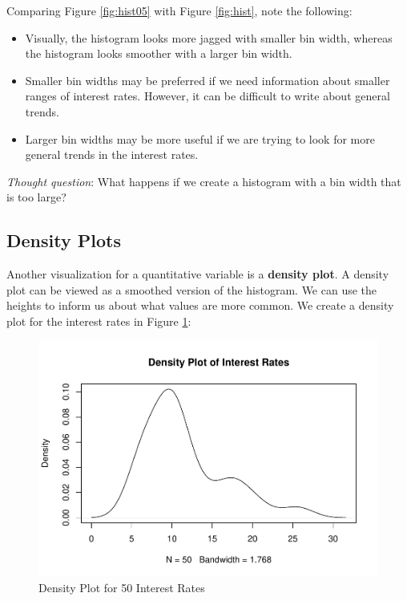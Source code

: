 \documentclass[
]{book}
\newenvironment{Shaded}{\begin{snugshade}}{\end{snugshade}}
\newcommand{\AttributeTok}[1]{\textcolor[rgb]{0.13,0.29,0.53}{#1}}
\newcommand{\DocumentationTok}[1]{\textcolor[rgb]{0.56,0.35,0.01}{\textbf{\textit{#1}}}}
\newcommand{\FunctionTok}[1]{\textcolor[rgb]{0.13,0.29,0.53}{\textbf{#1}}}
\newcommand{\NormalTok}[1]{#1}
\newcommand{\SpecialCharTok}[1]{\textcolor[rgb]{0.81,0.36,0.00}{\textbf{#1}}}
\newcommand{\StringTok}[1]{\textcolor[rgb]{0.31,0.60,0.02}{#1}}
\begin{document}
Comparing Figure \ref{fig:hist05} with Figure \ref{fig:hist}, note the following:

\begin{itemize}
\item
  Visually, the histogram looks more jagged with smaller bin width, whereas the histogram looks smoother with a larger bin width.
\item
  Smaller bin widths may be preferred if we need information about smaller ranges of interest rates. However, it can be difficult to write about general trends.
\item
  Larger bin widths may be more useful if we are trying to look for more general trends in the interest rates.
\end{itemize}

\emph{Thought question}: What happens if we create a histogram with a bin width that is too large?

\hypertarget{densplots}{%
\subsection{Density Plots}\label{densplots}}

Another visualization for a quantitative variable is a \textbf{density plot}. A density plot can be viewed as a smoothed version of the histogram. We can use the heights to inform us about what values are more common. We create a density plot for the interest rates in Figure \ref{fig:dens}:

\begin{Shaded}
\end{Shaded}

\begin{figure}
\centering
\includegraphics{bookdown-demo_files/figure-latex/dens-1.pdf}
\caption{\label{fig:dens}Density Plot for 50 Interest Rates}
\end{figure}
\end{document}
